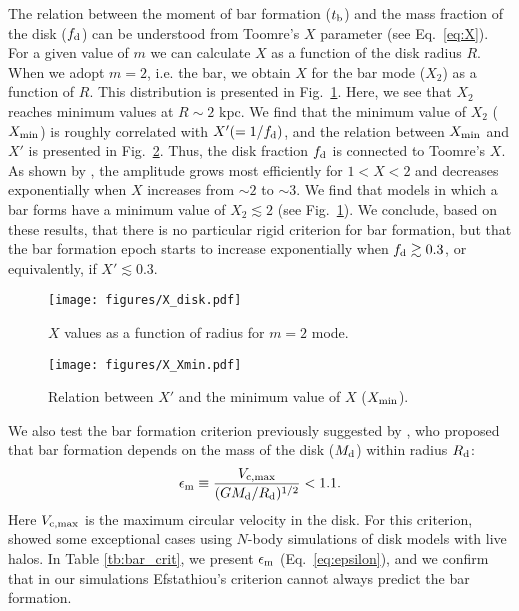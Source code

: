 The relation between the moment of bar formation ($t_{\rm b}$) and 
the mass fraction of the disk ($f_{\rm d}$) can be
understood from Toomre's $X$ parameter (see Eq.~\ref{eq:X}). 
For a given value of $m$ we can calculate $X$ as a function of the disk radius $R$.
When we adopt $m=2$, i.e. the bar, we obtain $X$ for the bar mode ($X_2$) as a function of $R$.
This distribution is presented in Fig.~\ref{fig:X_disk}. Here, we see that $X_2$
reaches minimum values at $R\sim 2$ kpc. We find that the minimum value of $X_2$ ($X_{\rm min}$)
is roughly correlated with $X'(=1/f_{\rm d})$, and the relation between $X_{\rm min}$ and $X'$ is 
presented in Fig.~\ref{fig:X}. Thus, the disk fraction $f_{\rm d}$ is connected to 
Toomre's $X$.
As shown by \citet{1981seng.proc..111T}, the amplitude grows most efficiently for $1<X<2$
and decreases exponentially when $X$ increases from $\sim 2$ to $\sim 3$.
We find that models in which a bar forms have a minimum value of $X_2\lesssim 2$ 
(see Fig.~\ref{fig:X_disk}).
We conclude, based on these results, that there is no particular rigid criterion for bar
formation, but that the bar formation epoch starts to increase exponentially
when $f_{\rm d}\gtrsim0.3$, or equivalently, if $X'\lesssim0.3$.


\begin{figure}
\texttt{[image: figures/X\_disk.pdf]}
\caption{$X$ values as a function of radius for $m=2$ mode. \label{fig:X_disk}}
\end{figure}


\begin{figure}
\texttt{[image: figures/X\_Xmin.pdf]}
\caption{Relation between $X'$ and the minimum value of $X$ ($X_{\rm min}$).\label{fig:X}}
\end{figure}



We also test the bar formation criterion previously suggested by
\citet{1982MNRAS.199.1069E}, who
proposed that bar formation depends on the mass of the
disk ($M_{\rm d}$) within radius $R_{\rm d}$:
\begin{eqnarray}
\epsilon _{\rm m} \equiv \frac{V_{\rm c, max}}{(GM_{\rm d}/R_{\rm d})^{1/2}}<1.1.
\label{eq:epsilon}
\end{eqnarray}
Here $V_{\rm c, max}$ is the maximum circular velocity in the disk.
For this criterion, \citet{2008MNRAS.390L..69A} showed some exceptional
cases using $N$-body simulations of disk models with live halos.
In Table \ref{tb:bar_crit}, we present $\epsilon_{\rm m}$ (Eq.~\ref{eq:epsilon}),
and we confirm that in our simulations Efstathiou's criterion cannot always predict 
the bar formation.






